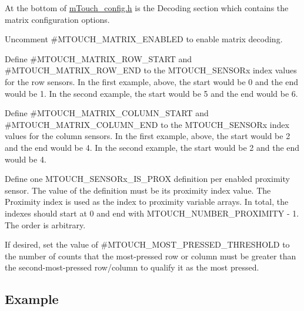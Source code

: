 \begin{DoxyEnumerate}
\item At the bottom of \hyperlink{m_touch__config_8h}{m\+Touch\+\_\+config.\+h} is the \textquotesingle{}Decoding\textquotesingle{} section which contains the matrix configuration options. 
\begin{DoxyEnumerate}
\item Uncomment \#\+M\+T\+O\+U\+C\+H\+\_\+\+M\+A\+T\+R\+I\+X\+\_\+\+E\+N\+A\+B\+L\+E\+D to enable matrix decoding. 
\item Define \#\+M\+T\+O\+U\+C\+H\+\_\+\+M\+A\+T\+R\+I\+X\+\_\+\+R\+O\+W\+\_\+\+S\+T\+A\+R\+T and \#\+M\+T\+O\+U\+C\+H\+\_\+\+M\+A\+T\+R\+I\+X\+\_\+\+R\+O\+W\+\_\+\+E\+N\+D to the M\+T\+O\+U\+C\+H\+\_\+\+S\+E\+N\+S\+O\+Rx index values for the row sensors. In the first example, above, the start would be \textquotesingle{}0\textquotesingle{} and the end would be \textquotesingle{}1\textquotesingle{}. In the second example, the start would be \textquotesingle{}5\textquotesingle{} and the end would be \textquotesingle{}6\textquotesingle{}. 
\item Define \#\+M\+T\+O\+U\+C\+H\+\_\+\+M\+A\+T\+R\+I\+X\+\_\+\+C\+O\+L\+U\+M\+N\+\_\+\+S\+T\+A\+R\+T and \#\+M\+T\+O\+U\+C\+H\+\_\+\+M\+A\+T\+R\+I\+X\+\_\+\+C\+O\+L\+U\+M\+N\+\_\+\+E\+N\+D to the M\+T\+O\+U\+C\+H\+\_\+\+S\+E\+N\+S\+O\+Rx index values for the column sensors. In the first example, above, the start would be \textquotesingle{}2\textquotesingle{} and the end would be \textquotesingle{}4\textquotesingle{}. In the second example, the start would be \textquotesingle{}2\textquotesingle{} and the end would be \textquotesingle{}4\textquotesingle{}. 
\item Define one M\+T\+O\+U\+C\+H\+\_\+\+S\+E\+N\+S\+O\+Rx\+\_\+\+I\+S\+\_\+\+P\+R\+O\+X definition per enabled proximity sensor. The value of the definition must be its \textquotesingle{}proximity index\textquotesingle{} value. The \textquotesingle{}Proximity index\textquotesingle{} is used as the index to proximity variable arrays. In total, the indexes should start at 0 and end with M\+T\+O\+U\+C\+H\+\_\+\+N\+U\+M\+B\+E\+R\+\_\+\+P\+R\+O\+X\+I\+M\+I\+T\+Y -\/ 1. The order is arbitrary. 
\item If desired, set the value of \#\+M\+T\+O\+U\+C\+H\+\_\+\+M\+O\+S\+T\+\_\+\+P\+R\+E\+S\+S\+E\+D\+\_\+\+T\+H\+R\+E\+S\+H\+O\+L\+D to the number of counts that the most-\/pressed row or column must be greater than the second-\/most-\/pressed row/column to qualify it as the \textquotesingle{}most pressed\textquotesingle{}. 
\end{DoxyEnumerate}
\end{DoxyEnumerate}\hypertarget{feat_matrix_featMatrix-Ex}{}\subsection{Example}\label{feat_matrix_featMatrix-Ex}

